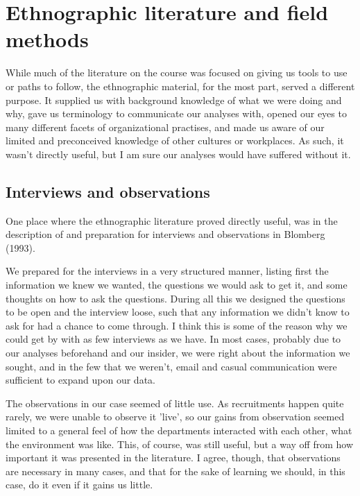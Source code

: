 \section*{Ethnographic literature and field methods}
While much of the literature on the course was focused on giving us tools to use or paths to follow, the ethnographic material, for the most part, served a different purpose.
It supplied us with background knowledge of what we were doing and why, gave us terminology to communicate our analyses with, opened our eyes to many different facets of organizational practises, and made us aware of our limited and preconceived knowledge of other cultures or workplaces.
As such, it wasn't directly useful, but I am sure our analyses would have suffered without it.

\subsection*{Interviews and observations}
One place where the ethnographic literature proved directly useful, was in the description of and preparation for interviews and observations in Blomberg (1993).

We prepared for the interviews in a very structured manner, listing first the information we knew we wanted, the questions we would ask to get it, and some thoughts on how to ask the questions.
During all this we designed the questions to be open and the interview loose, such that any information we didn't know to ask for had a chance to come through.
I think this is some of the reason why we could get by with as few interviews as we have. 
In most cases, probably due to our analyses beforehand and our insider, we were right about the information we sought, and in the few that we weren't, email and casual communication were sufficient to expand upon our data.

The observations in our case seemed of little use.
As recruitments happen quite rarely, we were unable to observe it 'live', so our gains from observation seemed limited to a general feel of how the departments interacted with each other, what the environment was like.
This, of course, was still useful, but a way off from how important it was presented in the literature.
I agree, though, that observations are necessary in many cases, and that for the sake of learning we should, in this case, do it even if it gains us little.